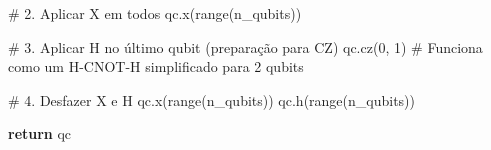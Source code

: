 \documentclass[
  brazilian,
]{report}
\newenvironment{Shaded}{\begin{snugshade}}{\end{snugshade}}
\newcommand{\BuiltInTok}[1]{\textcolor[rgb]{0.00,0.23,0.31}{#1}}
\newcommand{\CommentTok}[1]{\textcolor[rgb]{0.37,0.37,0.37}{#1}}
\newcommand{\ControlFlowTok}[1]{\textcolor[rgb]{0.00,0.23,0.31}{\textbf{#1}}}
\newcommand{\DecValTok}[1]{\textcolor[rgb]{0.68,0.00,0.00}{#1}}
\newcommand{\NormalTok}[1]{\textcolor[rgb]{0.00,0.23,0.31}{#1}}
\begin{document}
\begin{tcolorbox}
\begin{Shaded}
\begin{Highlighting}[]
    \CommentTok{\# 2. Aplicar X em todos}
\NormalTok{    qc.x(}\BuiltInTok{range}\NormalTok{(n\_qubits))}
    
    \CommentTok{\# 3. Aplicar H no último qubit (preparação para CZ)}
\NormalTok{    qc.cz(}\DecValTok{0}\NormalTok{, }\DecValTok{1}\NormalTok{) }\CommentTok{\# Funciona como um H{-}CNOT{-}H simplificado para 2 qubits}
    
    \CommentTok{\# 4. Desfazer X e H}
\NormalTok{    qc.x(}\BuiltInTok{range}\NormalTok{(n\_qubits))}
\NormalTok{    qc.h(}\BuiltInTok{range}\NormalTok{(n\_qubits))}
    
    \ControlFlowTok{return}\NormalTok{ qc}
\end{Highlighting}
\end{Shaded}

\end{tcolorbox}
\end{document}
